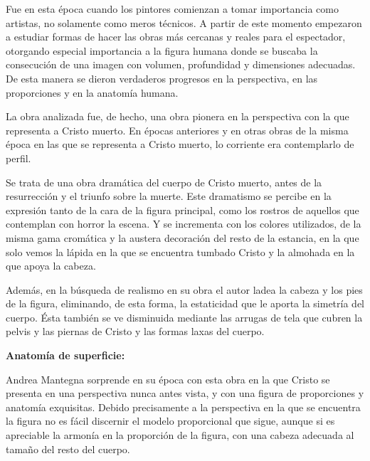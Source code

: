 Fue en esta época cuando los pintores comienzan a tomar importancia como artistas, no solamente como meros técnicos. A partir de este momento empezaron a estudiar formas de hacer las obras más cercanas y reales para el espectador, otorgando especial importancia a la figura humana donde se buscaba la consecución de una imagen con volumen, profundidad y dimensiones adecuadas. De esta manera se dieron verdaderos progresos en la perspectiva, en las proporciones y en la anatomía humana.

La obra analizada fue, de hecho, una obra pionera en la perspectiva con la que representa a Cristo muerto. En épocas anteriores y en otras obras de la misma época en las que se representa a Cristo muerto, lo corriente era contemplarlo de perfil.

Se trata de una obra dramática del cuerpo de Cristo muerto, antes de la resurrección y el triunfo sobre la muerte. Este dramatismo se percibe en la expresión tanto de la cara de la figura principal, como los rostros de aquellos que contemplan con horror la escena. Y se incrementa con los colores utilizados, de la misma gama cromática y la austera decoración del resto de la estancia, en la que solo vemos la lápida en la que se encuentra tumbado Cristo y la almohada en la que apoya la cabeza.

Además, en la búsqueda de realismo en su obra el autor ladea la cabeza y los pies de la figura, eliminando, de esta forma, la estaticidad que le aporta la simetría del cuerpo. Ésta también se ve disminuida mediante las arrugas de tela que cubren la pelvis y las piernas de Cristo y las formas laxas del cuerpo.



\vspace{12pt}
\textbf{Anatomía de superficie:}

Andrea Mantegna sorprende en su época con esta obra en la que Cristo se presenta en una perspectiva nunca antes vista, y con una figura de proporciones y anatomía exquisitas. Debido precisamente a la perspectiva en la que se encuentra la figura no es fácil discernir el modelo proporcional que sigue, aunque si es apreciable la armonía en la proporción de la figura, con una cabeza adecuada al tamaño del resto del cuerpo.

